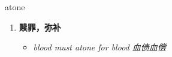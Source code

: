 
\begin{frame}
{\huge atone}
\begin{center}
\begin{enumerate}\Large
  \item \textbf{赎罪，弥补}
  \begin{itemize}
    \item \em{\Large{blood must atone for blood 血债血偿}}
  \end{itemize}
\end{enumerate}
\end{center}
\end{frame}
